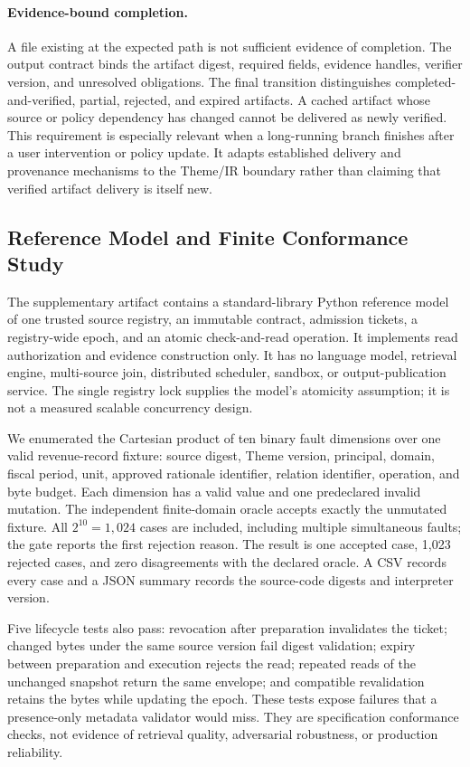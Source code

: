 \documentclass[11pt]{article}
\begin{document}
\paragraph{Evidence-bound completion.}
A file existing at the expected path is not sufficient evidence of completion. The output contract binds the artifact digest, required fields, evidence handles, verifier version, and unresolved obligations. The final transition distinguishes completed-and-verified, partial, rejected, and expired artifacts. A cached artifact whose source or policy dependency has changed cannot be delivered as newly verified. This requirement is especially relevant when a long-running branch finishes after a user intervention or policy update. It adapts established delivery and provenance mechanisms to the Theme/IR boundary rather than claiming that verified artifact delivery is itself new.

\subsection{Reference Model and Finite Conformance Study}
\label{sec:ir-conformance}

The supplementary artifact contains a standard-library Python reference model of one trusted source registry, an immutable contract, admission tickets, a registry-wide epoch, and an atomic check-and-read operation. It implements read authorization and evidence construction only. It has no language model, retrieval engine, multi-source join, distributed scheduler, sandbox, or output-publication service. The single registry lock supplies the model's atomicity assumption; it is not a measured scalable concurrency design.

We enumerated the Cartesian product of ten binary fault dimensions over one valid revenue-record fixture: source digest, Theme version, principal, domain, fiscal period, unit, approved rationale identifier, relation identifier, operation, and byte budget. Each dimension has a valid value and one predeclared invalid mutation. The independent finite-domain oracle accepts exactly the unmutated fixture. All $2^{10}=1{,}024$ cases are included, including multiple simultaneous faults; the gate reports the first rejection reason. The result is one accepted case, 1{,}023 rejected cases, and zero disagreements with the declared oracle. A CSV records every case and a JSON summary records the source-code digests and interpreter version.

Five lifecycle tests also pass: revocation after preparation invalidates the ticket; changed bytes under the same source version fail digest validation; expiry between preparation and execution rejects the read; repeated reads of the unchanged snapshot return the same envelope; and compatible revalidation retains the bytes while updating the epoch. These tests expose failures that a presence-only metadata validator would miss. They are specification conformance checks, not evidence of retrieval quality, adversarial robustness, or production reliability.
\end{document}
